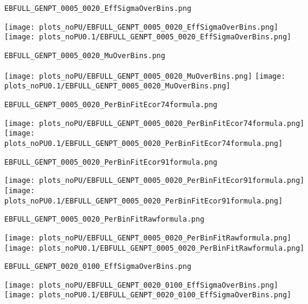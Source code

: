 \begin{frame}[fragile]
\begin{verbatim}
EBFULL_GENPT_0005_0020_EffSigmaOverBins.png
\end{verbatim}
\texttt{[image: plots\_noPU/EBFULL\_GENPT\_0005\_0020\_EffSigmaOverBins.png]}
\texttt{[image: plots\_noPU0.1/EBFULL\_GENPT\_0005\_0020\_EffSigmaOverBins.png]}
\end{frame}
\begin{frame}[fragile]
\begin{verbatim}
EBFULL_GENPT_0005_0020_MuOverBins.png
\end{verbatim}
\texttt{[image: plots\_noPU/EBFULL\_GENPT\_0005\_0020\_MuOverBins.png]}
\texttt{[image: plots\_noPU0.1/EBFULL\_GENPT\_0005\_0020\_MuOverBins.png]}
\end{frame}
\begin{frame}[fragile]
\begin{verbatim}
EBFULL_GENPT_0005_0020_PerBinFitEcor74formula.png
\end{verbatim}
\texttt{[image: plots\_noPU/EBFULL\_GENPT\_0005\_0020\_PerBinFitEcor74formula.png]}
\texttt{[image: plots\_noPU0.1/EBFULL\_GENPT\_0005\_0020\_PerBinFitEcor74formula.png]}
\end{frame}
\begin{frame}[fragile]
\begin{verbatim}
EBFULL_GENPT_0005_0020_PerBinFitEcor91formula.png
\end{verbatim}
\texttt{[image: plots\_noPU/EBFULL\_GENPT\_0005\_0020\_PerBinFitEcor91formula.png]}
\texttt{[image: plots\_noPU0.1/EBFULL\_GENPT\_0005\_0020\_PerBinFitEcor91formula.png]}
\end{frame}
\begin{frame}[fragile]
\begin{verbatim}
EBFULL_GENPT_0005_0020_PerBinFitRawformula.png
\end{verbatim}
\texttt{[image: plots\_noPU/EBFULL\_GENPT\_0005\_0020\_PerBinFitRawformula.png]}
\texttt{[image: plots\_noPU0.1/EBFULL\_GENPT\_0005\_0020\_PerBinFitRawformula.png]}
\end{frame}
\begin{frame}[fragile]
\begin{verbatim}
EBFULL_GENPT_0020_0100_EffSigmaOverBins.png
\end{verbatim}
\texttt{[image: plots\_noPU/EBFULL\_GENPT\_0020\_0100\_EffSigmaOverBins.png]}
\texttt{[image: plots\_noPU0.1/EBFULL\_GENPT\_0020\_0100\_EffSigmaOverBins.png]}
\end{frame}
